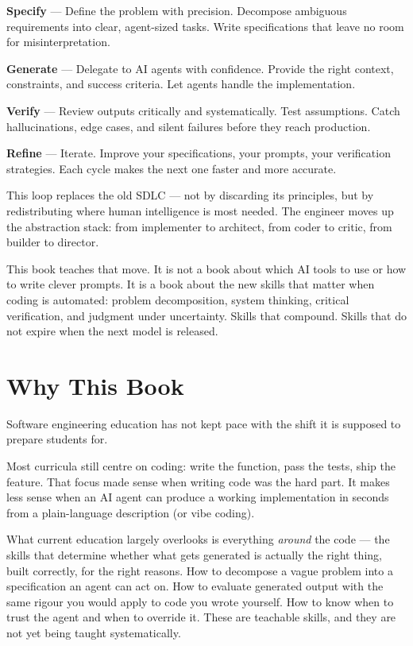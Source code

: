 \documentclass[11pt,a4paper]{book}
\begin{document}
\textbf{Specify} --- Define the problem with precision. Decompose ambiguous requirements into clear, agent-sized tasks. Write specifications that leave no room for misinterpretation.

\textbf{Generate} --- Delegate to AI agents with confidence. Provide the right context, constraints, and success criteria. Let agents handle the implementation.

\textbf{Verify} --- Review outputs critically and systematically. Test assumptions. Catch hallucinations, edge cases, and silent failures before they reach production.

\textbf{Refine} --- Iterate. Improve your specifications, your prompts, your verification strategies. Each cycle makes the next one faster and more accurate.

This loop replaces the old SDLC --- not by discarding its principles, but by redistributing where human intelligence is most needed. The engineer moves up the abstraction stack: from implementer to architect, from coder to critic, from builder to director.

This book teaches that move. It is not a book about which AI tools to use or how to write clever prompts. It is a book about the new skills that matter when coding is automated: problem decomposition, system thinking, critical verification, and judgment under uncertainty. Skills that compound. Skills that do not expire when the next model is released.





\medskip

\section{Why This Book}

Software engineering education has not kept pace with the shift it is supposed to prepare students for.

Most curricula still centre on coding: write the function, pass the tests, ship the feature. That focus made sense when writing code was the hard part. It makes less sense when an AI agent can produce a working implementation in seconds from a plain-language description (or vibe coding).

What current education largely overlooks is everything \textit{around} the code --- the skills that determine whether what gets generated is actually the right thing, built correctly, for the right reasons. How to decompose a vague problem into a specification an agent can act on. How to evaluate generated output with the same rigour you would apply to code you wrote yourself. How to know when to trust the agent and when to override it. These are teachable skills, and they are not yet being taught systematically.
\end{document}

